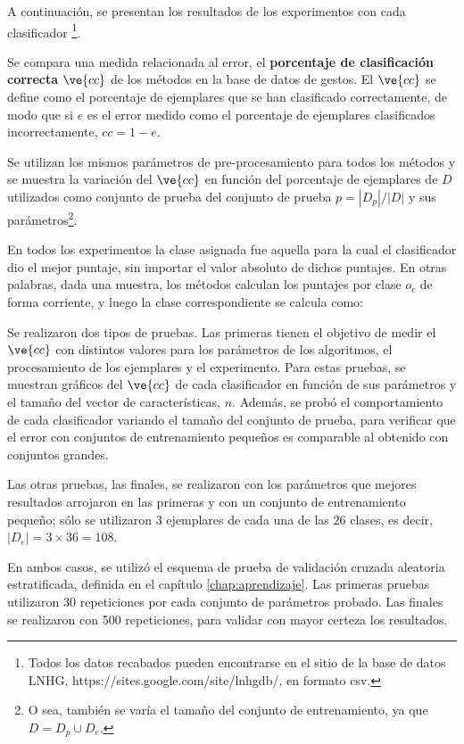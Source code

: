 A continuación, se presentan los resultados de los experimentos con cada clasificador \footnote{Todos los datos recabados pueden encontrarse en el sitio de la base de datos LNHG, https://sites.google.com/site/lnhgdb/, en formato csv.}. 


\newcommand{\cc}{$\ve{cc}$ }

Se compara una medida relacionada al error, el \textbf{porcentaje de clasificación correcta} \cc de los métodos en la base de datos de gestos. El \cc se define como el porcentaje de ejemplares que se han clasificado correctamente, de modo que si $e$ es el error medido como el porcentaje de ejemplares clasificados incorrectamente, $cc=1-e$.

Se utilizan los mismos parámetros de pre-procesamiento para todos los métodos y se muestra la variación del \cc en función del porcentaje de ejemplares de $D$ utilizados como conjunto de prueba del conjunto de prueba $p=|D_p| / |D|$ y sus parámetros\footnote{O sea, también se varía el tamaño del conjunto de entrenamiento, ya que $D= D_p \cup D_e$.}.

En todos los experimentos la clase asignada fue aquella para la cual el clasificador dio el mejor puntaje, sin importar el valor absoluto de dichos puntajes. En otras palabras, dada una muestra, los métodos calculan los puntajes por clase $o_c$ de forma corriente, y luego la clase correspondiente se calcula como:

Se realizaron dos tipos de pruebas. Las primeras tienen el objetivo de medir el \cc con distintos valores para los parámetros de los algoritmos, el procesamiento de los ejemplares y el experimento. Para estas pruebas, se muestran gráficos del \cc  de cada clasificador en función de sus parámetros y el tamaño del vector de características, $n$. Además, se probó el comportamiento de cada clasificador variando el tamaño del conjunto de prueba, para verificar que el error con conjuntos de entrenamiento pequeños es comparable al obtenido con conjuntos grandes. 

Las otras pruebas, las finales, se realizaron con los parámetros que mejores resultados arrojaron en las primeras y con un conjunto de entrenamiento pequeño; sólo se utilizaron 3 ejemplares de cada una de las 26 clases, es decir, $|D_e|= 3 \times 36 = 108 $. 

En ambos casos, se utilizó el esquema de prueba de validación cruzada aleatoria estratificada, definida en el capítulo \ref{chap:aprendizaje}. Las primeras pruebas utilizaron 30 repeticiones por cada conjunto de parámetros probado. Las finales se realizaron con 500 repeticiones, para validar con mayor certeza los resultados.

